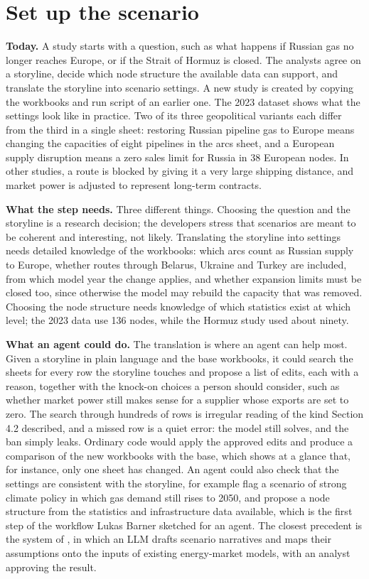 \section{Set up the scenario}

\textbf{Today.} A study starts with a question, such as what happens if Russian gas no longer reaches Europe, or if the Strait of Hormuz is closed.
The analysts agree on a storyline, decide which node structure the available data can support, and translate the storyline into scenario settings.
A new study is created by copying the workbooks and run script of an earlier one.
The 2023 dataset shows what the settings look like in practice.
Two of its three geopolitical variants each differ from the third in a single sheet: restoring Russian pipeline gas to Europe means changing the capacities of eight pipelines in the arcs sheet, and a European supply disruption means a zero sales limit for Russia in 38 European nodes.
In other studies, a route is blocked by giving it a very large shipping distance, and market power is adjusted to represent long-term contracts.

\textbf{What the step needs.} Three different things.
Choosing the question and the storyline is a research decision; the developers stress that scenarios are meant to be coherent and interesting, not likely.
Translating the storyline into settings needs detailed knowledge of the workbooks: which arcs count as Russian supply to Europe, whether routes through Belarus, Ukraine and Turkey are included, from which model year the change applies, and whether expansion limits must be closed too, since otherwise the model may rebuild the capacity that was removed.
Choosing the node structure needs knowledge of which statistics exist at which level; the 2023 data use 136 nodes, while the Hormuz study used about ninety.

\textbf{What an agent could do.} The translation is where an agent can help most.
Given a storyline in plain language and the base workbooks, it could search the sheets for every row the storyline touches and propose a list of edits, each with a reason, together with the knock-on choices a person should consider, such as whether market power still makes sense for a supplier whose exports are set to zero.
The search through hundreds of rows is irregular reading of the kind Section 4.2 described, and a missed row is a quiet error: the model still solves, and the ban simply leaks.
Ordinary code would apply the approved edits and produce a comparison of the new workbooks with the base, which shows at a glance that, for instance, only one sheet has changed.
An agent could also check that the settings are consistent with the storyline, for example flag a scenario of strong climate policy in which gas demand still rises to 2050, and propose a node structure from the statistics and infrastructure data available, which is the first step of the workflow Lukas Barner sketched for an agent.
The closest precedent is the system of \citet{golden2026agentic}, in which an LLM drafts scenario narratives and maps their assumptions onto the inputs of existing energy-market models, with an analyst approving the result.

